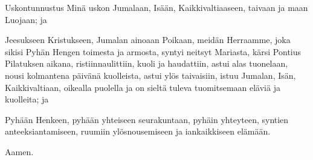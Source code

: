   \begin{passage}[FI]{Uskontunnustus}
    Minä uskon Jumalaan, Isään, Kaikkivaltiaaseen, taivaan ja maan Luojaan; ja
    \par
    Jeesukseen Kristukseen, Jumalan ainoaan Poikaan, meidän Herraamme,
    joka sikisi Pyhän Hengen toimesta ja armosta, syntyi neitsyt Mariasta,
    kärsi Pontius Pilatuksen aikana, ristiinnaulittiin, kuoli ja haudattiin,
    astui alas tuonelaan, nousi kolmantena päivänä kuolleista, astui ylös
    taivaisiin, istuu Jumalan, Isän, Kaikkivaltiaan, oikealla puolella ja on
    sieltä tuleva tuomitsemaan eläviä ja kuolleita; ja
    \par
    Pyhään Henkeen, pyhään yhteiseen seurakuntaan, pyhäin yhteyteen, syntien
    anteeksiantamiseen, ruumiin ylösnousemiseen ja iankaikkiseen elämään.
    \par
    Aamen.
  \end{passage}
\endsong


